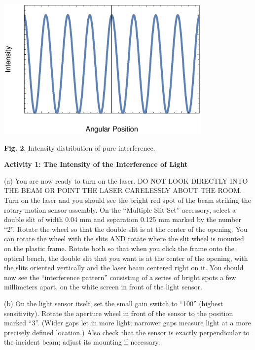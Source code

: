 \vspace{-0.10cm}
{\centering \includegraphics[height=2.75in]{diffraction/diffractionFig1.eps} \par}
\vspace{0.1cm}

{\centering \textbf{Fig. 2}. Intensity distribution of pure interference.\par}

\textbf{Activity 1: The Intensity of the Interference of Light }

(a) You are now ready to turn on the laser. DO NOT LOOK DIRECTLY INTO
THE BEAM OR POINT THE LASER CARELESSLY ABOUT THE ROOM. Turn on the
laser and you should see the bright red spot of the beam striking
the rotary motion sensor assembly. On the ``Multiple Slit Set'' accessory, 
select a double slit of width 0.04 mm and separation 0.125 mm marked by the number “2”. 
Rotate the 
wheel so that the double slit is at the center of the opening.
You can rotate the wheel with the slits AND rotate where the slit wheel is mounted
on the plastic frame. Rotate both so that when you click the frame onto the optical bench, the double slit that
you want is at the center of the opening, with the slits oriented vertically and the laser beam centered right on
it. You should now see the “interference pattern” consisting of a series of bright spots a few millimeters apart,
on the white screen in front of the light sensor.

(b) On the light sensor itself, set the small gain switch to “100” (highest sensitivity). Rotate the aperture wheel
in front of the sensor to the position marked “3”. (Wider gaps let in more light; narrower gaps measure light
at a more precisely defined location.) Also check that the sensor is exactly perpendicular to the incident beam;
adjust its mounting if necessary.

